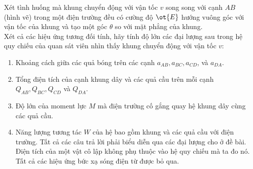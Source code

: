 \begin{vd}
\begin{center}
\end{center}
  Xét tình huống mà khung chuyển động với vận tốc $v$ song song với cạnh ${AB}$ (hình vẽ) trong một điện trường đều có cường độ $\ot{E}$ hướng vuông góc với vận tốc của khung và tạo một góc $\theta$ so với mặt phẳng của khung.\\
Xét cả các hiệu ứng tương đối tính, hãy tính độ lớn các đại lượng sau trong hệ quy chiếu của quan sát viên nhìn thấy khung chuyển động với vận tốc $v$:
\begin{enumerate}[1)]
    \item Khoảng cách giữa các quả bóng trên các cạnh $a_{A B}, a_{B C}, a_{C D}$, và $a_{D A}$.
\item Tổng điện tích của cạnh khung dây và các quả cầu trên mỗi cạnh $Q_{A B}, Q_{B C}, Q_{C D}$ và $Q_{D A}$.
\item Độ lớn của moment lực $M$ mà điện trường cố gắng quay hệ khung dây cùng các quả cầu.
\item Năng lượng tương tác $W$ của hệ bao gồm khung và các quả cầu với điện trường. Tất cả các câu trả lời phải biểu diễn qua các đại lượng cho ở đề bài. Điện tích của một vật cô lập không phụ thuộc vào hệ quy chiếu mà ta đo nó. Tất cả các hiệu ứng bức xạ sóng điện từ được bỏ qua.
\end{enumerate}
\end{vd}
